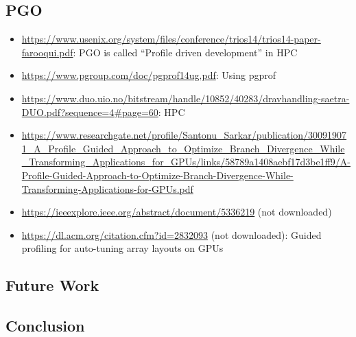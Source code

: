 \subsection{PGO}
\begin{sloppypar}
	\begin{itemize}
		\item \url{https://www.usenix.org/system/files/conference/trios14/trios14-paper-farooqui.pdf}: PGO is called \enquote{Profile driven development} in HPC
		\item \url{https://www.pgroup.com/doc/pgprof14ug.pdf}: Using pgprof
		\item \url{https://www.duo.uio.no/bitstream/handle/10852/40283/dravhandling-saetra-DUO.pdf?sequence=4#page=60}: HPC
		\item \url{https://www.researchgate.net/profile/Santonu_Sarkar/publication/300919071_A_Profile_Guided_Approach_to_Optimize_Branch_Divergence_While_Transforming_Applications_for_GPUs/links/58789a1408aebf17d3be1ff9/A-Profile-Guided-Approach-to-Optimize-Branch-Divergence-While-Transforming-Applications-for-GPUs.pdf}
		\item \url{https://ieeexplore.ieee.org/abstract/document/5336219} (not downloaded)
		\item \url{https://dl.acm.org/citation.cfm?id=2832093} (not downloaded): Guided profiling for auto-tuning array layouts on GPUs
	\end{itemize}
\end{sloppypar}

\subsection{Future Work}
\label{sub:futurework}

\subsection{Conclusion}
\label{sub:conclusion}